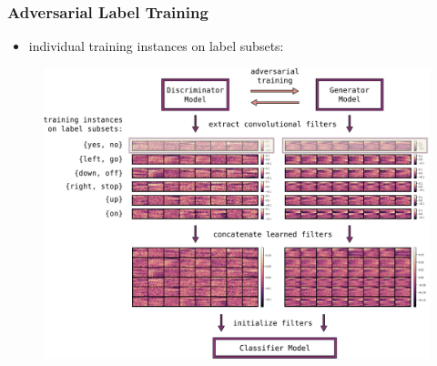 \begin{frame}
  \frametitle{Adversarial Label Training}
  \begin{itemize}
    \item individual training instances on label subsets:
  \end{itemize}
  \begin{figure} \includegraphics[height=0.7\textheight]{../4_nn/figs/nn_adv_label_scheme.pdf} \end{figure}
\end{frame}


